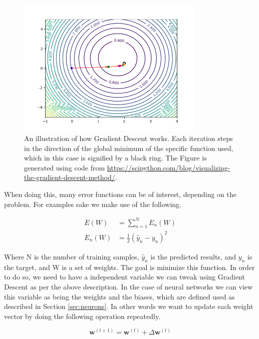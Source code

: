 \begin{figure}
    \centering
    \includegraphics[width=0.8\textwidth]{./pictures/method/GradientDesc.png}
    \caption{An illustration of how Gradient Descent works. Each iteration steps
        in the direction of the global minimum of the specific function used,
        which in this case is signified by a black ring. The Figure is generated
        using code from
        \url{https://scipython.com/blog/visualizing-the-gradient-descent-method/}.}
    \label{fig:grad}
\end{figure}

When doing this, many error functions can be of interest, depending on the
problem. For examples sake we make use of the following.

\begin{align}
E(W) &= \sum_{n=1}^N E_n(W)\\
E_n(W) &= \frac{1}{2}(\hat{y}_n - y_n)^2
\end{align}

Where N is the number of training samples, $\hat{y}_n$ is the predicted results,
and $y_n$ is the target, and W is a set of weights. The goal is minimize this
function. In order to do so, we need to have a independent variable we can
tweak using Gradient Descent as per the above description. In the case of
neural networks we can view this variable as being the weights and the biases,
which are defined used as described in Section \ref{sec:neurons}. In other
words we want to update each weight vector by doing the following operation
repeatedly.

\begin{equation}\label{eq:update}
    \mathbf{w}^{(t+1)} = \mathbf{w}^{(t)} + \Delta \mathbf{w}^{(t)}
\end{equation}

